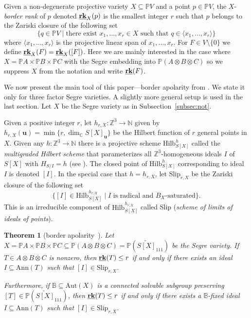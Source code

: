 \documentclass[12pt]{amsart}
\newtheorem{theorem}{Theorem}[section]
\theoremstyle{definition}
\theoremstyle{remark}
\theoremstyle{definition}
\newcommand{\brk}{{\underline{{\bf rk}}}}
\newcommand{\Slip}[2]{\mathrm{Slip}_{#1,#2}}
\newcommand{\CC}{\mathbb{C}}
\newcommand{\PP}{\mathbb{P}}
\newcommand{\Ann}{\mathrm{Ann}}
\newcommand{\Hilb}{\mathrm{Hilb}}
\begin{document}
Given a non-degenerate projective variety $X\subseteq \PP V$ and a point $p\in \PP V$, the $X$-\emph{border rank} of $p$ denoted $\brk_X(p)$ is the smallest integer $r$ such that
$p$ belongs to the Zariski closure of the following set
\[
\{q\in \PP V \mid \textrm{there exist } x_1,\ldots, x_r \in X \textrm{ such that } q\in \langle x_1,\ldots, x_r\rangle\}
\]
where $\langle x_1,\ldots, x_r\rangle$ is the projective linear span of $x_1,\ldots, x_r$. For $F\in V\setminus\{0\}$ we define $\brk_X(F) = \brk_X([F])$.
Here we are mainly interested in the case where $X=\mathbb{P}A \times \mathbb{P}B\times \mathbb{P}C$ with the Segre embedding into $\PP (A\otimes B\otimes C)$ so we suppress $X$ from the notation and write $\brk(F)$. 


We now present the main tool of this paper---border apolarity from \cite{BB19}. We state it only for three factor Segre varieties. A slightly more general setup is used in the last section. Let $X$ be the Segre variety as in Subsection~\ref{subsec:not}.

Given a positive integer $r$, let $h_{r,X}\colon \mathbb{Z}^3\to \mathbb{N}$ given by $h_{r,X}(\mathbf{u}) = \min \{r, \dim_\CC S[X]_\mathbf{u}\}$ be the Hilbert function of $r$ general points in $X$.
Given any $h\colon \mathbb{Z}^3\to \mathbb{N}$ there is a projective scheme $\Hilb_{S[X]}^{h}$ called the \emph{multigraded Hilbert scheme} that parameterizes all $\mathbb{Z}^3$-homogeneous ideals $I$ of $S[X]$ with $H_{S/I} = h$ (see \cite{HS04}). The closed point of $\Hilb_{S[X]}^h$ corresponding to ideal $I$ is denoted $[I]$.
In the special case that $h=h_{r,X}$, let $\mathrm{Slip}_{r,X}$ be the Zariski closure of the following set
\[
\{[I]\in \Hilb_{S[X]}^{h_{r,X}} \mid I \textrm{ is radical and }B_X\textrm{-saturated}\}.
\]
This is an irreducible component of $\Hilb_{S[X]}^{h_{r,X}}$ \cite[Proposition~3.13]{BB19} called Slip (\emph{scheme of limits of ideals of points}).

\begin{theorem}[border apolarity~{\cite[Theorems~3.15~and~4.3]{BB19}}]\label{ba}
  Let $X = \PP A\times \PP B \times \PP C \subseteq \PP (A\otimes B\otimes C) = \PP (\widetilde{S[X]}_{111})$ be the Segre variety. If $T\in A\otimes B\otimes C$ is nonzero, then $\brk(T) \le r$ if and only if there exists an ideal $I\subseteq \Ann(T)$ such that $[I]\in \Slip{r}{X}$. 

  Furthermore, if $\mathbb{B}\subseteq \mathrm{Aut}(X)$ is a connected solvable subgroup preserving $[T] \in \PP(\widetilde{S[X]}_{111})$, then $\brk(T) \le r$ if and only if there exists a $\mathbb{B}$-fixed ideal $I\subseteq \Ann(T)$ such that $[I]\in \Slip{r}{X}$.
\end{theorem}
\end{document}
